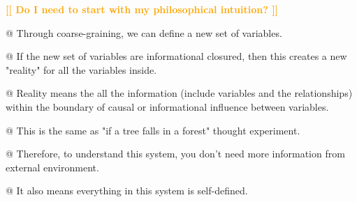 \documentclass[utf8]{article}
\newenvironment{ants}
			{
			 \begin{easylist}[itemize]		
		 	}
			{
			\end{easylist}
			}
\newcommand{\toWrite}[1]{\noindent
			\textcolor{Orange}{\textbf{[[ #1 ]]}}}
\begin{document}
		
		\begin{ants}
			\toWrite{Do I need to start with my philosophical intuition?}
			
			@ Through coarse-graining, we can define a new set of variables.
			
			@ If the new set of variables are informational closured, then this creates a new "reality" for all the variables inside. 
			
			@ Reality means the all the information (include variables and the relationships) within the boundary of causal or informational influence between variables.
			
			@ This is the same as "if a tree falls in a forest" thought experiment. 
			
			@ Therefore, to understand this system, you don't need more information from external environment.
			
			@ It also means everything in this system is self-defined. 
			
			
		\end{ants}
		
		
		
		
		
\end{document}
